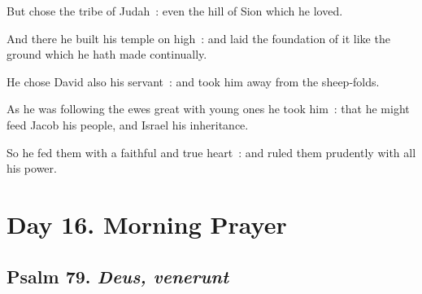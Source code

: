 But chose the tribe of Judah~: even the hill of Sion which he loved.\par
{}And there he built his temple on high~: and laid the foundation of it like the ground which he hath made continually.\par
{}He chose David also his servant~: and took him away from the sheep-folds.\par
{}As he was following the ewes great with young ones he took him~: that he might feed Jacob his people, and Israel his inheritance.\par
{}So he fed them with a faithful and true heart~: and ruled them prudently with all his power.\par


\clearpage
\section*{Day 16. Morning Prayer}

\subsection{Psalm 79. \textit{Deus, venerunt}}


